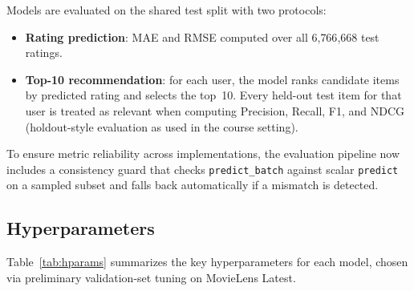 \documentclass[11pt]{article}
\begin{document}
Models are evaluated on the shared test split with two protocols:

\begin{itemize}
\item \textbf{Rating prediction}: MAE and RMSE computed over all 6{,}766{,}668 test ratings.
\item \textbf{Top-10 recommendation}: for each user, the model ranks candidate items by predicted rating and selects the top~10.  Every held-out test item for that user is treated as relevant when computing Precision, Recall, F1, and NDCG (holdout-style evaluation as used in the course setting).
\end{itemize}
To ensure metric reliability across implementations, the evaluation pipeline now includes a consistency guard that checks \texttt{predict\_batch} against scalar \texttt{predict} on a sampled subset and falls back automatically if a mismatch is detected.

\subsection{Hyperparameters}

Table~\ref{tab:hparams} summarizes the key hyperparameters for each model, chosen via preliminary validation-set tuning on MovieLens Latest.

\begin{table}[t]
\centering
{}
\caption{Key hyperparameter settings for each model on MovieLens Latest; full presets in \texttt{docs/TRAINING\_PARAMETERS.md}. $L_2$ reg for Deep model.}
\label{tab:hparams}
\end{table}
\end{document}
